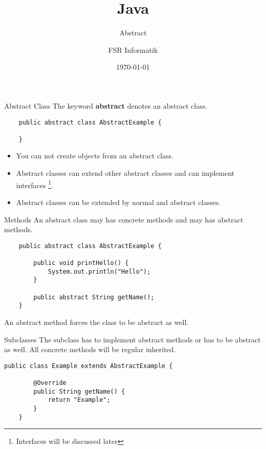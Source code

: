 


\title{Java}
\subtitle{Abstract}
\author{FSR Informatik}
\date{\today}



\begin{frame}
\titlepage
\end{frame}

\subsection{}
\begin{frame}[fragile]{Abstract Class}
	The keyword \textbf{abstract} denotes an abstract class.
	\vfill
	\begin{lstlisting}
	public abstract class AbstractExample {
	
	}	
	\end{lstlisting}
	\vfill
    \begin{itemize}
	\item You can not create objects from an abstract class.\\
	\item Abstract classes can extend other abstract classes and can implement interfaces \footnote[1]{Interfaces will be discussed later}.\\
	\item Abstract classes can be extended by normal and abstract classes.
    \end{itemize}
\end{frame}

\begin{frame}[fragile]{Methods}
	An abstract class may has concrete methods and may has abstract methods.
	\begin{lstlisting}
	public abstract class AbstractExample {
	
	    public void printHello() {
	        System.out.println("Hello");	    
	    }
	    
	    public abstract String getName();
	}	
	\end{lstlisting}
	An abstract method forces the class to be abstract as well. \\
\end{frame}

\begin{frame}[fragile]{Subclasses}
	The subclass has to implement abstract methods or has to be abstract as well.
	All concrete methods will be regular inherited.
	\begin{lstlisting}[escapechar=!]
	public class Example extends AbstractExample {
	    
	    @Override
	    public String getName() {
	        return "Example";	    
	    }
	}	
	\end{lstlisting}
\end{frame}

